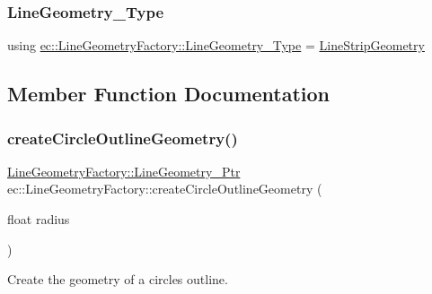 \mbox{\label{classec_1_1_line_geometry_factory_a3025abbbb9ff132e43d46b17f1381213}} 
\subsubsection{\texorpdfstring{Line\+Geometry\+\_\+\+Type}{LineGeometry\_Type}}
{\footnotesize\ttfamily using \mbox{\hyperlink{classec_1_1_line_geometry_factory_a3025abbbb9ff132e43d46b17f1381213}{ec\+::\+Line\+Geometry\+Factory\+::\+Line\+Geometry\+\_\+\+Type}} =  \mbox{\hyperlink{classec_1_1_line_strip_geometry}{Line\+Strip\+Geometry}}}



\subsection{Member Function Documentation}
\mbox{\label{classec_1_1_line_geometry_factory_a7546d1c1b7125a621f2e8a652035e843}} 
\subsubsection{\texorpdfstring{create\+Circle\+Outline\+Geometry()}{createCircleOutlineGeometry()}}
{\footnotesize\ttfamily \mbox{\hyperlink{classec_1_1_line_geometry_factory_a8f7bd7480ebc0dbc77930d81dcb69678}{Line\+Geometry\+Factory\+::\+Line\+Geometry\+\_\+\+Ptr}} ec\+::\+Line\+Geometry\+Factory\+::create\+Circle\+Outline\+Geometry (\begin{DoxyParamCaption}\item[{float}]{radius }\end{DoxyParamCaption})\hspace{0.3cm}{\ttfamily [static]}}



Create the geometry of a circle\textquotesingle{}s outline. 


